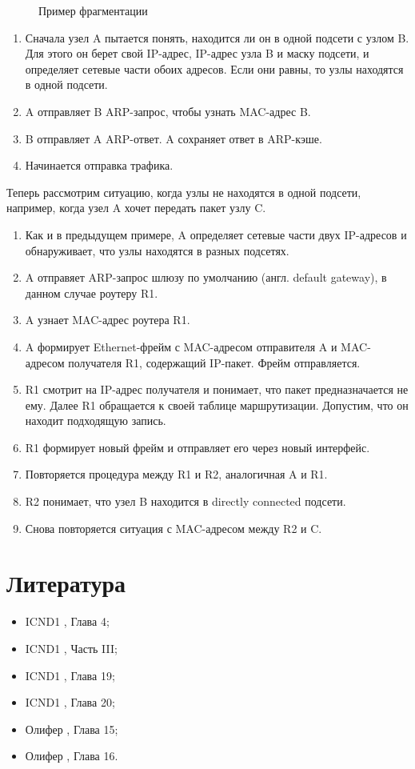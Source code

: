 \begin{figure}[h!]
	\caption{Пример фрагментации}
	\label{fig:ip_send}
\end{figure}
\begin{enumerate}
	\item Сначала узел A пытается понять, находится ли он в одной подсети с узлом B. Для этого он берет свой IP-адрес, IP-адрес узла B и маску подсети, и определяет сетевые части обоих адресов. Если они равны, то узлы находятся в одной подсети. 
	\item A отправляет B ARP-запрос, чтобы узнать MAC-адрес B. 
	\item B отправляет A ARP-ответ. A сохраняет ответ в ARP-кэше.
	\item Начинается отправка трафика.
\end{enumerate}
Теперь рассмотрим ситуацию, когда узлы не находятся в одной подсети, например, когда узел A хочет передать пакет узлу C. 
\begin{enumerate}	
	\item Как и в предыдущем примере, A определяет сетевые части двух IP-адресов и обнаруживает, что узлы находятся в разных подсетях.
	\item A отправяет ARP-запрос шлюзу по умолчанию (англ. default gateway), в данном случае роутеру R1.
	\item A узнает MAC-адрес роутера R1.
	\item A формирует Ethernet-фрейм с MAC-адресом отправителя A и MAC-адресом получателя R1, содержащий IP-пакет. Фрейм отправляется.
	\item R1 смотрит на IP-адрес получателя и понимает, что пакет предназначается не ему. Далее R1 обращается к своей таблице маршрутизации. Допустим, что он находит подходящую запись. 
	\item R1 формирует новый фрейм и отправляет его через новый интерфейс.
	\item Повторяется процедура между R1 и R2, аналогичная A и R1.
	\item R2 понимает, что узел B находится в directly connected подсети. 
	\item Снова повторяется ситуация с MAC-адресом между R2 и C.
\end{enumerate}
\section{Литература}
\begin{itemize}
	\item ICND1 \cite{icnd1eng}, Глава 4;
	\item ICND1 \cite{icnd1eng}, Часть III;
	\item ICND1 \cite{icnd1eng}, Глава 19;
	\item ICND1 \cite{icnd1eng}, Глава 20;
	\item Олифер \cite{olipher}, Глава 15;
	\item Олифер \cite{olipher}, Глава 16.
\end{itemize}